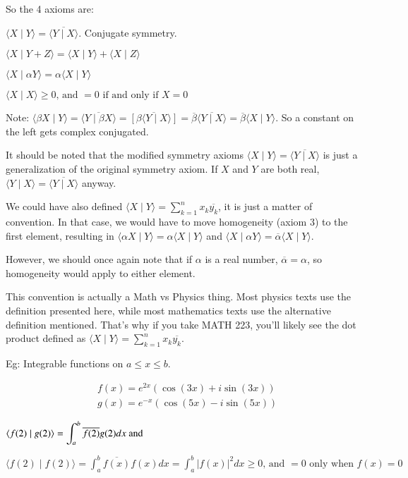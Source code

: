 \documentclass{report}
\begin{document}
So the 4 axioms are:

$\langle X \mid Y\rangle=\overline{\langle Y \mid X\rangle}$. Conjugate symmetry.

$\langle X \mid Y+Z\rangle=\langle X \mid Y\rangle+\langle X \mid Z\rangle $

$\langle X \mid \alpha Y\rangle=\alpha\langle X \mid Y\rangle$

$\langle X \mid X\rangle \geqslant 0 \text {, and }=0 \text { if and only if } X=0$

Note: $\langle\beta X \mid Y\rangle=\overline{\langle Y \mid \beta X\rangle}=\overline{[\beta\langle Y \mid X\rangle]}=\overline{\beta}\overline{\langle Y \mid X\rangle}=\overline{\beta}\langle X \mid Y\rangle$. So a constant on the left gets complex conjugated.

It should be noted that the modified symmetry axioms $\langle X \mid Y\rangle=\overline{\langle Y \mid X\rangle}$ is just a generalization of the original symmetry axiom. If $X$ and $Y$ are both real, $\langle Y\mid X \rangle = \overline{\langle Y\mid X \rangle}$ anyway.

We could have also defined $\langle X \mid Y\rangle=\sum\limits_{k=1}^{n} x_{k} \overline{y_{k}}$, it is just a matter of convention. In that case, we would have to move homogeneity (axiom 3) to the first element, resulting in $\langle\alpha X \mid  Y\rangle=\alpha\langle X \mid Y\rangle$ and $\langle X \mid \alpha Y\rangle=\overline{\alpha}\langle X \mid Y\rangle$. 

However, we should once again note that if $\alpha$ is a real number, $\overline\alpha = \alpha$, so homogeneity would apply to either element.

This convention is actually a Math vs Physics thing. Most physics texts use the definition presented here, while most mathematics texts use the alternative definition mentioned. That's why if you take MATH 223, you'll likely see the dot product defined as $\langle X \mid Y\rangle=\sum\limits_{k=1}^{n} x_{k} \overline{y_{k}}$.

Eg: Integrable functions on $a \leq x \leq b$.

$$
\begin{aligned}
& f(x)=e^{2 x}(\cos (3 x)+i \sin (3 x)) \\
& g(x)=e^{-x}(\cos (5 x)-i \sin (5 x)) 
\end{aligned}
$$

$\langle f(2) \mid g(2)\rangle=\displaystyle\int_{a}^{b} \overline{f(2)} g(2) d x \text { and } \\$

$\langle f(2) \mid f(2)\rangle=\displaystyle\int_{a}^{b} \overline{f(x)} f(x) d x=\displaystyle\int_{a}^{b}|f(x)|^{2} d x \geqslant 0 \text {, and }=0 \text { only when } f(x)=0$
\end{document}
